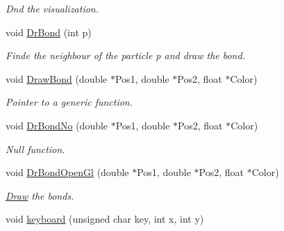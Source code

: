 \begin{DoxyCompactItemize}
\begin{DoxyCompactList}\small\item\em \-Dnd the visualization. \end{DoxyCompactList}\item 
\hypertarget{classElPoly_abe58ec64ad127f7a85a62feefbfac4b6}{void \hyperlink{classElPoly_abe58ec64ad127f7a85a62feefbfac4b6}{\-Dr\-Bond} (int p)}\label{classElPoly_abe58ec64ad127f7a85a62feefbfac4b6}

\begin{DoxyCompactList}\small\item\em \-Finde the neighbour of the particle p and draw the bond. \end{DoxyCompactList}\item 
\hypertarget{classElPoly_ab8aa99cf5632c9a9183e7881d25b1cf7}{void \hyperlink{classElPoly_ab8aa99cf5632c9a9183e7881d25b1cf7}{\-Draw\-Bond} (double $\ast$\-Pos1, double $\ast$\-Pos2, float $\ast$\-Color)}\label{classElPoly_ab8aa99cf5632c9a9183e7881d25b1cf7}

\begin{DoxyCompactList}\small\item\em \-Pointer to a generic function. \end{DoxyCompactList}\item 
\hypertarget{classElPoly_a6a54cbe2df971f838e96bef0ffb100d4}{void \hyperlink{classElPoly_a6a54cbe2df971f838e96bef0ffb100d4}{\-Dr\-Bond\-No} (double $\ast$\-Pos1, double $\ast$\-Pos2, float $\ast$\-Color)}\label{classElPoly_a6a54cbe2df971f838e96bef0ffb100d4}

\begin{DoxyCompactList}\small\item\em \-Null function. \end{DoxyCompactList}\item 
\hypertarget{classElPoly_a008a495b2076738e496001e0ba8a8ea4}{void \hyperlink{classElPoly_a008a495b2076738e496001e0ba8a8ea4}{\-Dr\-Bond\-Open\-Gl} (double $\ast$\-Pos1, double $\ast$\-Pos2, float $\ast$\-Color)}\label{classElPoly_a008a495b2076738e496001e0ba8a8ea4}

\begin{DoxyCompactList}\small\item\em \hyperlink{classDraw}{\-Draw} the bonds. \end{DoxyCompactList}\item 
\hypertarget{classElPoly_aef7ba2f69afb2d954545f64c7fe24b14}{void \hyperlink{classElPoly_aef7ba2f69afb2d954545f64c7fe24b14}{keyboard} (unsigned char key, int x, int y)}\label{classElPoly_aef7ba2f69afb2d954545f64c7fe24b14}


\end{DoxyCompactItemize}
